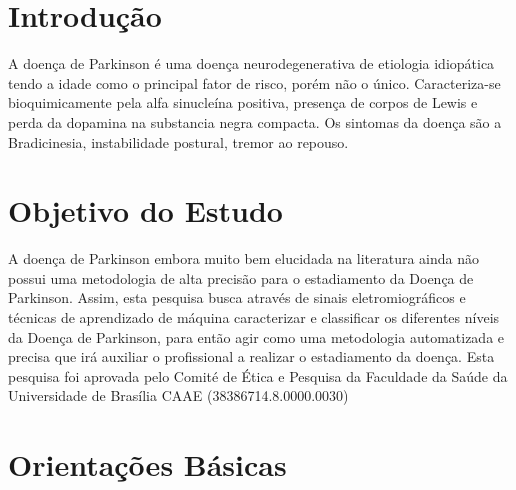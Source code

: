 \documentclass[a4paper,12pt]{report}
\begin{document}

\section*{Introdução}
A doença de Parkinson é uma doença neurodegenerativa de etiologia idiopática tendo a idade como o principal fator de risco, porém não o único. Caracteriza-se bioquimicamente pela alfa sinucleína positiva, presença de corpos de Lewis e perda da dopamina na substancia negra compacta. Os sintomas da doença são a Bradicinesia, instabilidade postural, tremor ao repouso. 

\section*{Objetivo do Estudo} 

A doença de Parkinson embora muito bem elucidada na literatura ainda não possui uma metodologia de alta precisão para o estadiamento da Doença de Parkinson. Assim, esta pesquisa busca através de sinais eletromiográficos e técnicas de aprendizado de máquina caracterizar e classificar os diferentes níveis da Doença de Parkinson, para então agir como uma metodologia automatizada e precisa que irá auxiliar o profissional a realizar o estadiamento da doença. Esta pesquisa foi aprovada pelo Comité de Ética e Pesquisa da Faculdade da Saúde da Universidade de Brasília CAAE (38386714.8.0000.0030)


\section*{Orientações Básicas}
\end{document}
